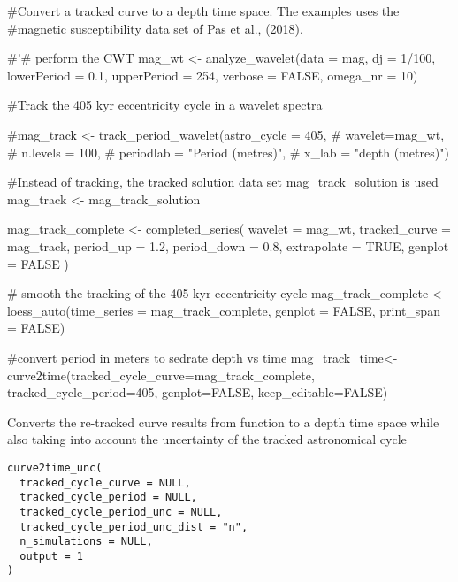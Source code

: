 \documentclass[a4paper]{book}
\begin{document}
\begin{Examples}
\begin{ExampleCode}

#Convert a tracked curve to a depth time space. The examples uses the
#magnetic susceptibility data set of Pas et al., (2018).

#'# perform the CWT
mag_wt <- analyze_wavelet(data = mag,
dj = 1/100,
lowerPeriod = 0.1,
upperPeriod = 254,
verbose = FALSE,
omega_nr = 10)

#Track the 405 kyr eccentricity cycle in a wavelet spectra

#mag_track <- track_period_wavelet(astro_cycle = 405,
#                                   wavelet=mag_wt,
#                                   n.levels = 100,
#                                   periodlab = "Period (metres)",
#                                   x_lab = "depth (metres)")

#Instead of tracking, the tracked solution data set mag_track_solution is used
mag_track <- mag_track_solution

mag_track_complete <- completed_series(
  wavelet = mag_wt,
  tracked_curve = mag_track,
  period_up = 1.2,
  period_down = 0.8,
  extrapolate = TRUE,
  genplot = FALSE
)

# smooth the tracking of the 405 kyr eccentricity cycle
mag_track_complete <- loess_auto(time_series = mag_track_complete,
genplot = FALSE, print_span = FALSE)

#convert period in meters to sedrate depth vs time
mag_track_time<- curve2time(tracked_cycle_curve=mag_track_complete,
tracked_cycle_period=405,
genplot=FALSE,
keep_editable=FALSE)


\end{ExampleCode}
\end{Examples}
%
\begin{Description}
Converts the re-tracked curve results from
 function to a depth time space while also
taking into account the uncertainty of the tracked astronomical cycle
\end{Description}
%
\begin{Usage}
\begin{verbatim}
curve2time_unc(
  tracked_cycle_curve = NULL,
  tracked_cycle_period = NULL,
  tracked_cycle_period_unc = NULL,
  tracked_cycle_period_unc_dist = "n",
  n_simulations = NULL,
  output = 1
)
\end{verbatim}
\end{Usage}
\end{document}

